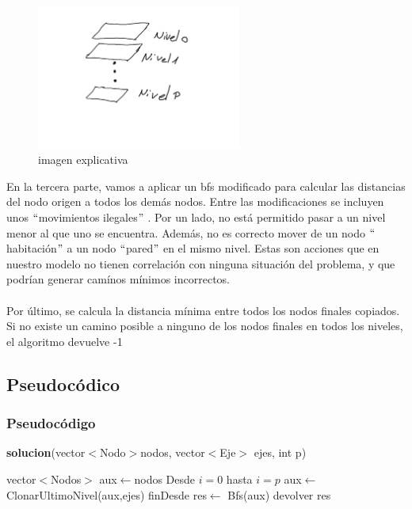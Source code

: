 \documentclass[spanish,12pt]{article}
\begin{document}
\begin{figure}[H]
\centering
\includegraphics[width=0.6\textwidth]{pto1}
\caption{imagen explicativa}
\end{figure}



En la tercera parte, vamos a aplicar un bfs modificado para calcular las distancias del nodo origen a todos los demás nodos. Entre las modificaciones se incluyen unos $``$movimientos ilegales$"$ . Por un lado, no está permitido pasar a un nivel menor al que uno se encuentra. Además, no es correcto mover de un nodo $``$habitación$"$ a un nodo $``$pared$"$ en el mismo nivel. Estas son acciones que en nuestro modelo no tienen correlación con ninguna situación del problema, y que podrían generar camínos mínimos incorrectos. 
\\
\\
Por último, se calcula la distancia mínima entre todos los nodos finales copiados. Si no existe un camino posible a ninguno de los nodos finales en todos los niveles, el algoritmo devuelve -1



\subsection{Pseudocódico}

\subsubsection{Pseudocódigo}

\begin{algorithm}[H]{\textbf{solucion}(vector$<$Nodo$>$nodos, vector$<$Eje$>$ ejes, int p)}
	\begin{algorithmic}[1]
		
		\State \quad vector$<$Nodos$>$ aux$\gets$nodos
		\State \quad  Desde $i=0$ hasta $i=p$
			\State \quad \quad aux$\gets$ ClonarUltimoNivel(aux,ejes)
		\State \quad finDesde
		\State \quad res$\gets$ Bfs(aux)
		\State \quad devolver res
	\end{algorithmic}
\end{algorithm}
\end{document}
